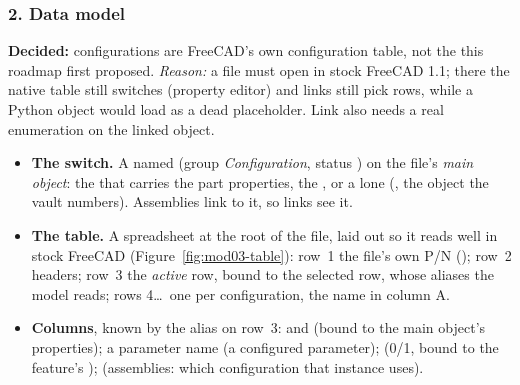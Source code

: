 \subsubsection*{2. Data model}

\textbf{Decided:} configurations are FreeCAD's own configuration table, not the 
 this roadmap first proposed. \emph{Reason:} a file must open in stock FreeCAD 1.1;
there the native table still switches (property editor) and links still pick rows, while a Python object
would load as a dead placeholder. Link  also needs a real enumeration on the linked object.

\begin{itemize}
  \item \textbf{The switch.} A  named  (group
        \emph{Configuration}, status ) on the file's \emph{main object}: the
         that carries the part properties, the , or a lone 
        (, the object the vault numbers). Assemblies link to it, so links see it.
  \item \textbf{The table.} A spreadsheet  at the root of the file, laid out so it reads
        well in stock FreeCAD (Figure~\ref{fig:mod03-table}): row~1 the file's own P/N
        (); row~2 headers; row~3 the \emph{active} row, bound to the selected row, whose
        aliases the model reads; rows 4\dots\ one per configuration, the name in column A.
  \item \textbf{Columns}, known by the alias on row~3:
         and  (bound to the main object's properties); a parameter name
        (a configured parameter);  (0/1, bound to the feature's );
         (assemblies: which configuration that instance uses).
\end{itemize}

